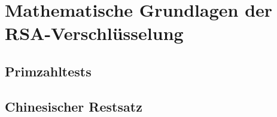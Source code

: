 \chapter{Mathematische Grundlagen der RSA-Verschlüsselung}


\newpage

\section{Primzahltests}

\newpage


\newpage


\newpage


\newpage


\newpage

\section{Chinesischer Restsatz}
